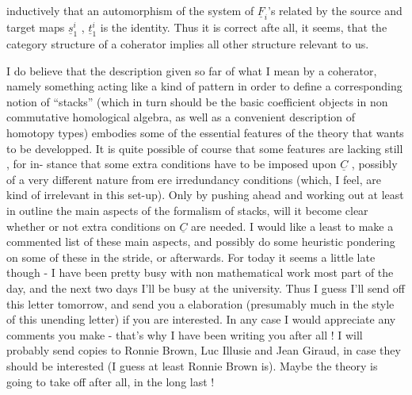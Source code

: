
 inductively that an automorphism of the system of $\underline{F}_i$'s  related by the
source and target maps $\underline{s}_1^i$ , $\underline{t}_1^i$  is the identity.  Thus it is correct afte
all, it seems,  that the category structure of a coherator implies all
other structure relevant to us.

I do believe that the description given so far of what I mean by a
coherator,  namely something acting like a kind of pattern in
order to define a corresponding notion of ``stacks'' (which in turn should
be the basic coefficient objects in non commutative homological algebra,
as well as a convenient description of homotopy types) embodies some of
the essential features of the theory  that wants to be developped. It is
quite possible of course that some features are lacking still ,  for in-%
stance that some extra conditions have to be imposed upon $\underline{C}$ ,  possibly
of a very different nature from ere irredundancy conditions (which, I
feel, are kind of irrelevant in this set-up).  Only by pushing ahead
and working out at least in outline the main aspects of the formalism of
stacks,  will it become clear whether or not extra conditions on $\underline{C}$ are
needed.  I would like a least to make a commented list of these main
aspects,  and possibly do some heuristic pondering on some of these in
the stride,  or afterwards.  For today it seems a little late though  -
I have been pretty busy with non mathematical work most part of the day,
and the next two days I'll be busy at the university.  Thus I guess I'll
send off this letter tomorrow,  and send you a  elaboration  (presumably
much in the style of this unending letter)  if you are interested.  In
any case I would appreciate any comments you make  -  that's why I have
been writing you after all !  I will probably send copies to Ronnie
Brown,  Luc Illusie and Jean Giraud,  in case they should be interested
(I guess at least Ronnie Brown is).  Maybe the theory is going to take
off after all,  in the long last !

